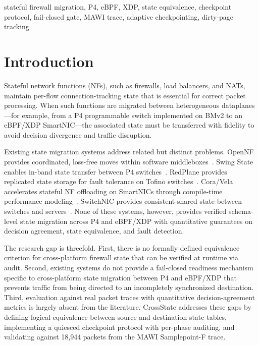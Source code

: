\documentclass[10pt, conference]{IEEEtran}
\begin{document}
\begin{keywords}
stateful firewall migration, P4, eBPF, XDP, state equivalence, checkpoint protocol, fail-closed gate, MAWI trace, adaptive checkpointing, dirty-page tracking
\end{keywords}

\section{Introduction}
\label{sec:introduction}

Stateful network functions (NFs), such as firewalls, load balancers, and NATs, maintain per-flow connection-tracking state that is essential for correct packet processing. When such functions are migrated between heterogeneous dataplanes---for example, from a P4 programmable switch implemented on BMv2 to an eBPF/XDP SmartNIC---the associated state must be transferred with fidelity to avoid decision divergence and traffic disruption.

Existing state migration systems address related but distinct problems. OpenNF provides coordinated, loss-free moves within software middleboxes~\cite{gember2014opennf}. Swing State enables in-band state transfer between P4 switches~\cite{luo2017swing}. RedPlane provides replicated state storage for fault tolerance on Tofino switches~\cite{kim2021redplane}. Cora/Vela accelerates stateful NF offloading on SmartNICs through compile-time performance modeling~\cite{xi2024cora}. SwitchNIC provides consistent shared state between switches and servers~\cite{lei2025switchnic}. None of these systems, however, provides verified schema-level state migration across P4 and eBPF/XDP with quantitative guarantees on decision agreement, state equivalence, and fault detection.

The research gap is threefold. First, there is no formally defined equivalence criterion for cross-platform firewall state that can be verified at runtime via audit. Second, existing systems do not provide a fail-closed readiness mechanism specific to cross-platform state migration between P4 and eBPF/XDP that prevents traffic from being directed to an incompletely synchronized destination. Third, evaluation against real packet traces with quantitative decision-agreement metrics is largely absent from the literature. CrossState addresses these gaps by defining logical equivalence between source and destination state tables, implementing a quiesced checkpoint protocol with per-phase auditing, and validating against 18{,}944 packets from the MAWI Samplepoint-F trace.
\end{document}
